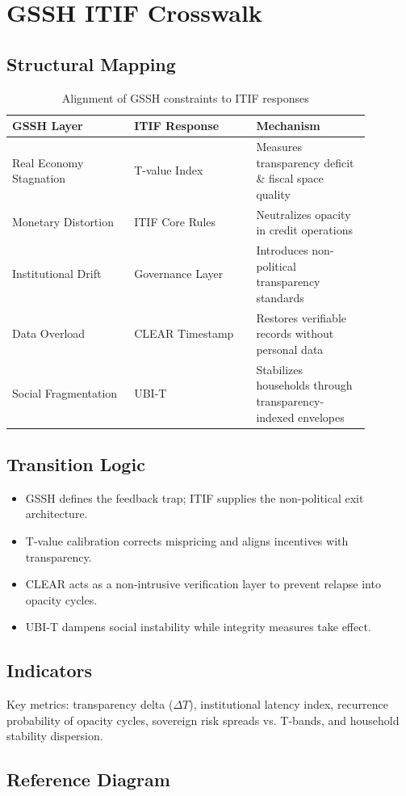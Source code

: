 \section{GSSH \textrightarrow{} ITIF Crosswalk}
\subsection{Structural Mapping}
\begin{table}[H]
  \centering
  \begin{tabular}{p{0.3\linewidth}p{0.3\linewidth}p{0.28\linewidth}}
    \toprule
    GSSH Layer & ITIF Response & Mechanism \\
    \midrule
    Real Economy Stagnation & T-value Index & Measures transparency deficit \& fiscal space quality \\
    Monetary Distortion & ITIF Core Rules & Neutralizes opacity in credit operations \\
    Institutional Drift & Governance Layer & Introduces non-political transparency standards \\
    Data Overload & CLEAR Timestamp & Restores verifiable records without personal data \\
    Social Fragmentation & UBI-T & Stabilizes households through transparency-indexed envelopes \\
    \bottomrule
  \end{tabular}
  \caption{Alignment of GSSH constraints to ITIF responses}
\end{table}

\subsection{Transition Logic}
\begin{itemize}
  \item GSSH defines the feedback trap; ITIF supplies the non-political exit architecture.
  \item T-value calibration corrects mispricing and aligns incentives with transparency.
  \item CLEAR acts as a non-intrusive verification layer to prevent relapse into opacity cycles.
  \item UBI-T dampens social instability while integrity measures take effect.
\end{itemize}

\subsection{Indicators}
Key metrics: transparency delta (\(\Delta T\)), institutional latency index, recurrence probability of opacity cycles, sovereign risk spreads vs. T-bands, and household stability dispersion.

\subsection{Reference Diagram}
